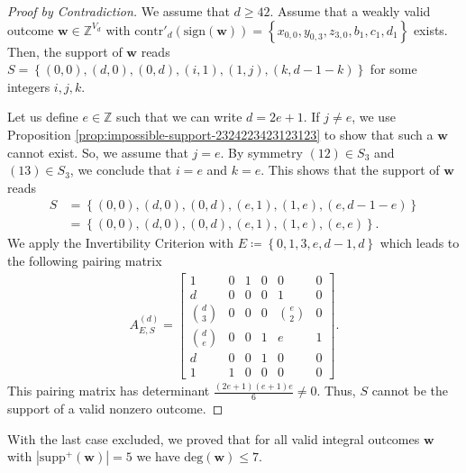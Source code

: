 \begin{proof}[Proof by Contradiction]
    We assume that \( d \geq 42 \). Assume that a weakly valid outcome \( \mathbf{w} \in \mathbb{Z}^{V_d} \) with \( \mathrm{contr}'_d(\mathrm{sign}(\mathbf{w})) =  \left\{ x_{0,0}, y_{0,3}, z_{3,0}, b_1, c_1, d_1 \right\} \) exists. Then, the support of \( \mathbf{w} \) reads \( S = \left\{ (0,0), (d,0), (0,d), (i,1), (1,j), (k, d-1-k) \right\} \)
    for some integers \( i,j, k \). 
    
    Let us define \( e \in \mathbb{Z} \) such that we can write \( d = 2e + 1 \). If \( j \neq e \), we use Proposition \ref{prop:impossible-support-2324223423123123} to show that such a \( \mathbf{w} \) cannot exist. So, we assume that \( j = e \). By symmetry \( (12) \in S_3 \) and \( (13) \in S_3 \), we conclude that \( i = e \) and \( k = e \). This shows that the support of \( \mathbf{w} \) reads
    \begin{align*}
        S &= \left\{ (0,0), (d,0), (0,d), (e,1), (1,e), (e, d-1-e) \right\} \\&= \left\{ (0,0), (d,0), (0,d), (e,1), (1,e), (e,e) \right\}.
    \end{align*}
    We apply the Invertibility Criterion with \( E \coloneqq \left\{ 0,1,3,e,d-1,d \right\}\) which leads to the following pairing matrix 
    \begin{align*}
        A^{(d)}_{E,S} = \begin{bmatrix}
            1 & 0 & 1 & 0 & 0 & 0 \\
            d & 0 & 0 & 0 & 1 & 0 \\
            \binom{d}{3} & 0 & 0 & 0 & \binom{e}{2} & 0 \\
            \binom{d}{e} & 0 & 0 & 1 & e & 1 \\
            d & 0 & 0 & 1 & 0 & 0 \\
            1 & 1 & 0 & 0 & 0 & 0
        \end{bmatrix}.
    \end{align*}
    This pairing matrix has determinant \( \frac{(2e + 1)(e + 1)e}{6} \neq 0 \). Thus, \( S \) cannot be the support of a valid nonzero outcome.
\end{proof}

With the last case excluded, we proved that for all valid integral outcomes \( \mathbf w \) with \( |\mathrm{supp}^+(\mathbf w)| = 5 \) we have \( \mathrm{deg}(\mathbf w) \leq 7 \).